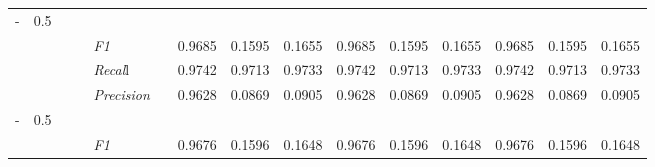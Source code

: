 \begin{table}[]
\begin{tabularx}{\textwidth}{XXlllllllllllll@{}}
- & 0.5 &  &  &                                                              &                                                                   &                                                             &                                                               &                                                                    &                                                              &                                                               &                                                                    &                                                              \\
                                                                    &                                                                     &                                                           &    & \textit{F1} &                                                      & 0.9685        & 0.1595        & 0.1655        & 0.9685        & 0.1595        & 0.1655        & 0.9685        & 0.1595        & 0.1655        \\
                                                                    &                                                                     &                                                           &    & \textit{Recal}l &                                                      & 0.9742    & 0.9713    & 0.9733    & 0.9742    & 0.9713    & 0.9733    & 0.9742    & 0.9713    & 0.9733    \\
                                                                    &                                                                     &                                                           &    & \textit{Precision} &                                                      & 0.9628 & 0.0869 & 0.0905 & 0.9628 & 0.0869 & 0.0905 & 0.9628 & 0.0869 & 0.0905 \\ \midrule
- & 0.5 &  &  &                                                              &                                                                   &                                                             &                                                               &                                                                    &                                                              &                                                               &                                                                    &                                                              \\
                                                                    &                                                                     &                                                           &    & \textit{F1} &                                                      & 0.9676        & 0.1596        & 0.1648        & 0.9676        & 0.1596        & 0.1648        & 0.9676        & 0.1596        & 0.1648        \\

\end{tabularx}
\end{table}
